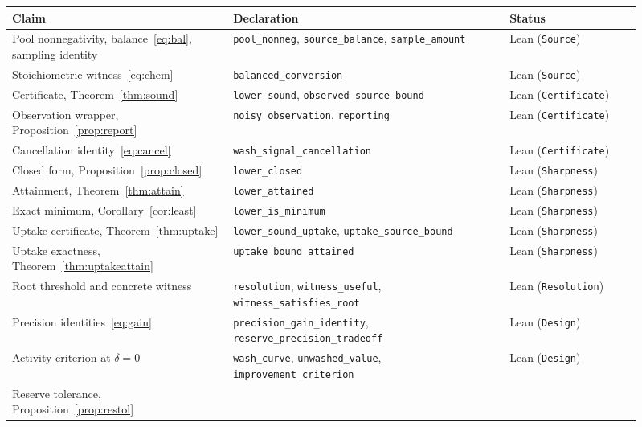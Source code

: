 \documentclass[11pt]{article}
\theoremstyle{plain}
\theoremstyle{definition}
\theoremstyle{remark}
\begin{document}
\begin{table}[t]
\centering\footnotesize
\setlength{\tabcolsep}{4pt}
\begin{tabular}{>{\raggedright\arraybackslash}p{0.32\linewidth}%
                >{\raggedright\arraybackslash}p{0.40\linewidth}%
                >{\raggedright\arraybackslash}p{0.19\linewidth}}
\toprule
Claim & Declaration & Status\\
\midrule
Pool nonnegativity, balance~\eqref{eq:bal}, sampling identity
 & \texttt{pool\_nonneg}, \texttt{source\_balance}, \texttt{sample\_amount}
 & Lean (\texttt{Source})\\
Stoichiometric witness~\eqref{eq:chem}
 & \texttt{balanced\_conversion} & Lean (\texttt{Source})\\
Certificate, Theorem~\ref{thm:sound}
 & \texttt{lower\_sound}, \texttt{observed\_source\_bound}
 & Lean (\texttt{Certificate})\\
Observation wrapper, Proposition~\ref{prop:report}
 & \texttt{noisy\_observation}, \texttt{reporting}
 & Lean (\texttt{Certificate})\\
Cancellation identity~\eqref{eq:cancel}
 & \texttt{wash\_signal\_cancellation} & Lean (\texttt{Certificate})\\
Closed form, Proposition~\ref{prop:closed}
 & \texttt{lower\_closed} & Lean (\texttt{Sharpness})\\
Attainment, Theorem~\ref{thm:attain}
 & \texttt{lower\_attained} & Lean (\texttt{Sharpness})\\
Exact minimum, Corollary~\ref{cor:least}
 & \texttt{lower\_is\_minimum} & Lean (\texttt{Sharpness})\\
Uptake certificate, Theorem~\ref{thm:uptake}
 & \texttt{lower\_sound\_uptake}, \texttt{uptake\_source\_bound}
 & Lean (\texttt{Sharpness})\\
Uptake exactness, Theorem~\ref{thm:uptakeattain}
 & \texttt{uptake\_bound\_attained} & Lean (\texttt{Sharpness})\\
Root threshold and concrete witness
 & \texttt{resolution}, \texttt{witness\_useful},
   \texttt{witness\_satisfies\_root} & Lean (\texttt{Resolution})\\
Precision identities~\eqref{eq:gain}
 & \texttt{precision\_gain\_identity},
   \texttt{reserve\_precision\_tradeoff} & Lean (\texttt{Design})\\
Activity criterion at $\delta=0$
 & \texttt{wash\_curve}, \texttt{unwashed\_value},
   \texttt{improvement\_criterion} & Lean (\texttt{Design})\\
Reserve tolerance, Proposition~\ref{prop:restol}

\end{tabular}
\end{table}
\end{document}
